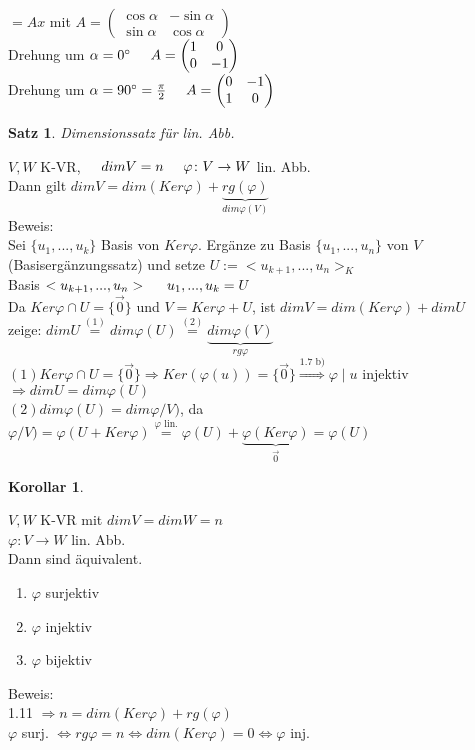 \documentclass[a4paper,11pt]{article}
\newtheorem{satz}[definition]{Satz}
\newtheorem{koro}[definition]{Korollar}
\newcommand{\zerovec}{\overset{\rightarrow}{0}}
\newcommand{\hsp}{\hspace{5mm}}
\begin{document}
$=Ax$ mit $A=\begin{pmatrix}\cos\alpha&-\sin\alpha\\\sin\alpha&\cos\alpha\end{pmatrix}$ \\
Drehung um $\alpha=0^\circ\hsp A=\begin{pmatrix}1&0\\0&-1\end{pmatrix}$ \\
Drehung um $\alpha=90^\circ=\frac{\pi}{2}\hsp A=\begin{pmatrix}0&-1\\1&0\end{pmatrix}$

\newpage

\begin{satz}
Dimensionssatz für lin. Abb.
\end{satz}
$V,W$ K-VR,$\hsp dimV=n\hsp\varphi\colon V\rightarrow W$ lin. Abb. \\
Dann gilt $dimV=dim(Ker\varphi)+\underbrace{rg(\varphi)}_{dim\varphi(V)}$ \\
Beweis: \\
Sei $\{u_1,...,u_k\}$ Basis von $Ker\varphi$. Ergänze zu Basis $\{u_1,...,u_n\}$ von $V$ (Basisergänzungssatz) und setze $U:=<u_{k+1},...,u_n>_K$ \\
Basis $<u_{k+1},...,u_n>\hsp u_1,...,u_k=U$ \\
Da $Ker\varphi\cap U=\{\zerovec\}$ und $V=Ker\varphi+U$, ist $dimV=dim(Ker\varphi)+dimU$ \\
zeige: $dimU\overset{(1)}{=}dim\varphi(U)\overset{(2)}{=}\underbrace{dim\varphi(V)}_{rg\varphi}$ \\
$(1) Ker\varphi\cap U=\{\zerovec\}\Rightarrow Ker(\varphi(u))=\{\zerovec\}\overset{\text{1.7 b)}}{\Rightarrow}\varphi\mid u$ injektiv $\Rightarrow dimU=dim\varphi(U)$ \\
$(2) dim\varphi(U)=dim\varphi/V)$, da $\varphi/V)=\varphi(U+Ker\varphi)\overset{\varphi\text{ lin.}}{=}\varphi(U)+\underbrace{\varphi(Ker\varphi)}_{\zerovec}=\varphi(U)$

\begin{koro}
\end{koro}
$V,W$ K-VR mit $dimV=dimW=n$ \\
$\varphi\colon V\rightarrow W$ lin. Abb. \\
Dann sind äquivalent.
\begin{enumerate}[label=\alph*)]
	\item $\varphi$ surjektiv
	\item $\varphi$ injektiv
	\item $\varphi$ bijektiv
\end{enumerate}
Beweis: \\
1.11 $\Rightarrow n=dim(Ker\varphi)+rg(\varphi)$ \\
$\varphi$ surj. $\Leftrightarrow rg\varphi=n\Leftrightarrow dim(Ker\varphi)=0\Leftrightarrow\varphi$ inj.
\end{document}
